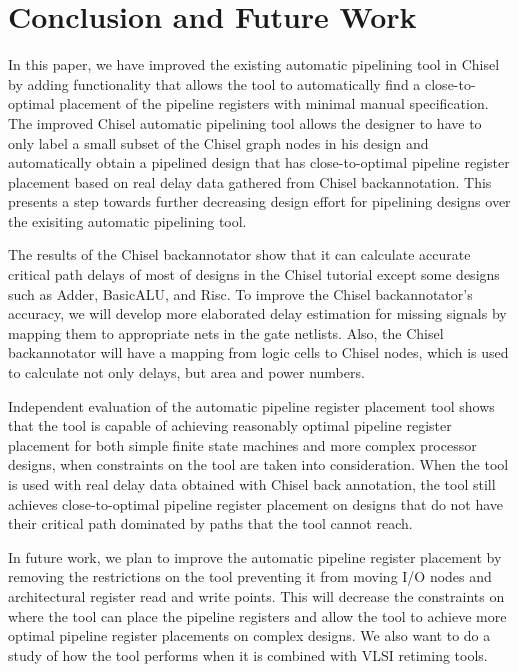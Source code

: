 \section{Conclusion and Future Work}
In this paper, we have improved the existing automatic pipelining tool in Chisel by adding functionality that allows the tool to automatically find a close-to-optimal placement of the pipeline registers with minimal manual specification. The improved Chisel automatic pipelining tool allows the designer to have to only label a small subset of the Chisel graph nodes in his design and automatically obtain a pipelined design that has close-to-optimal pipeline register placement based on real delay data gathered from Chisel backannotation. This presents a step towards further decreasing design effort for pipelining designs over the exisiting automatic pipelining tool.

The results of the Chisel backannotator show that it can calculate accurate critical path delays of most of designs in the Chisel tutorial except some designs such as Adder, BasicALU, and Risc. To improve the Chisel backannotator's accuracy, we will develop more elaborated delay estimation for missing signals by mapping them to appropriate nets in the gate netlists. Also, the Chisel backannotator will have a mapping from logic cells to Chisel nodes, which is used to calculate not only delays, but area and power numbers.

Independent evaluation of the automatic pipeline register placement tool shows that the tool is capable of achieving reasonably optimal pipeline register placement for both simple finite state machines and more complex processor designs, when constraints on the tool are taken into consideration. When the tool is used with real delay data obtained with Chisel back annotation, the tool still achieves close-to-optimal pipeline register placement on designs that do not have their critical path dominated by paths that the tool cannot reach.

In future work, we plan to improve the automatic pipeline register placement by removing the restrictions on the tool preventing it from moving I/O nodes and architectural register read and write points. This will decrease the constraints on where the tool can place the pipeline registers and allow the tool to achieve more optimal pipeline register placements on complex designs. We also want to do a study of how the tool performs when it is combined with VLSI retiming tools.
